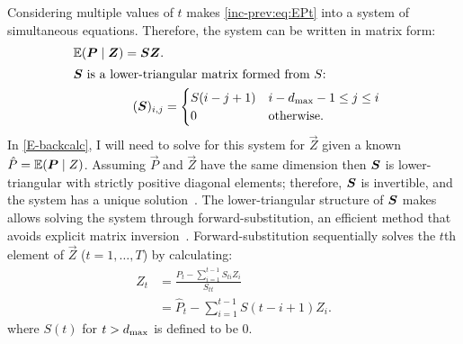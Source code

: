 \documentclass[thesis.tex]{subfiles}
\begin{document}
Considering multiple values of $t$ makes \cref{inc-prev:eq:EPt} into a system of simultaneous equations.
Therefore, the system can be written in matrix form:
\begin{align}
  \operatorname{\mathbb{E}}(\bm{P} \mid \bm{Z}) = \bm{S} \bm{Z}. \label{inc-prev:eq:EPt-matrix} \\
\intertext{$\bm{S}$ is a lower-triangular matrix formed from $S$:}
    (\bm{S})_{i,j} &= \begin{cases}
        S(i - j + 1) & i - d_\text{max} - 1 \leq j \leq i \\
        0 & \text{otherwise.}
    \end{cases} \label{inc-prev:eq:Smatrix}
\end{align}
In \cref{E-backcalc}, I will need to solve for this system for $\vec{Z}$ given a known $\hat{P} = \operatorname{\mathbb{E}}(\bm{P} \mid {Z})$.
Assuming $\vec{P}$ and $\vec{Z}$ have the same dimension then $\bm{S}$ is lower-triangular with strictly positive diagonal elements; therefore, $\bm{S}$ is invertible, and the system has a unique solution~\autocite[424]{bernsteinFacts}.
The lower-triangular structure of $\bm{S}$ makes allows solving the system through forward-substitution, an efficient method that avoids explicit matrix inversion~\autocite{cormenMatrix}.
Forward-substitution sequentially solves the $t$th element of $\vec{Z}$ ($t = 1, \dots, T$) by calculating:
\begin{align}
Z_t
&= \frac{\hat{P}_t - \sum_{i=1}^{t-1} S_{ti} Z_i}{S_{tt}} \\
&= \hat{P}_t - \sum_{i=1}^{t-1} S(t - i + 1) Z_i.
\label{inc-prev:eq:forward-substitute}
\end{align}
where $S(t)$ for $t > d_\text{max}$ is defined to be 0.

\end{document}

